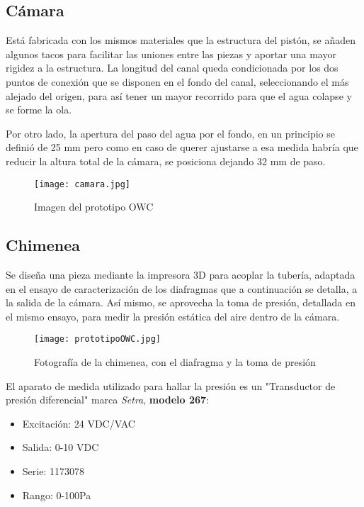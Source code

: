 \subsection{Cámara}\label{header-n602}

Está fabricada con los mismos materiales que la estructura del pistón,
se añaden algunos tacos para facilitar las uniones entre las piezas y
aportar una mayor rigidez a la estructura. La longitud del canal queda
condicionada por los dos puntos de conexión que se disponen en el fondo
del canal, seleccionando el más alejado del origen, para así tener un
mayor recorrido para que el agua colapse y se forme la ola.

Por otro lado, la apertura del paso del agua por el fondo, en un
principio se definió de 25 mm pero como en caso de querer ajustarse a
esa medida habría que reducir la altura total de la cámara, se posiciona
dejando 32 mm de paso.

\begin{figure}
\centering
\texttt{[image: camara.jpg]}
\caption{Imagen del prototipo OWC}
\label{fig:camara}
\end{figure}

\subsection{Chimenea}\label{header-n180}

Se diseña una pieza mediante la impresora 3D para acoplar la tubería,
adaptada en el ensayo de caracterización de los diafragmas que a
continuación se detalla, a la salida de la cámara. Así mismo, se
aprovecha la toma de presión, detallada en el mismo ensayo, para medir
la presión estática del aire dentro de la cámara.

\begin{figure}
\centering
\texttt{[image: prototipoOWC.jpg]}
\caption[Chimenea]{Fotografía de la chimenea, con el diafragma y la toma de presión}
\label{fig:prototipo}
\end{figure}

El aparato de medida utilizado para hallar la presión es un "Transductor
de presión diferencial" marca \emph{Setra}, \textbf{modelo 267}:

\begin{itemize}
\item
  Excitación: 24 VDC/VAC
\item
  Salida: 0-10 VDC
\item
  Serie: 1173078
\item
  Rango: 0-100Pa
\end{itemize}

